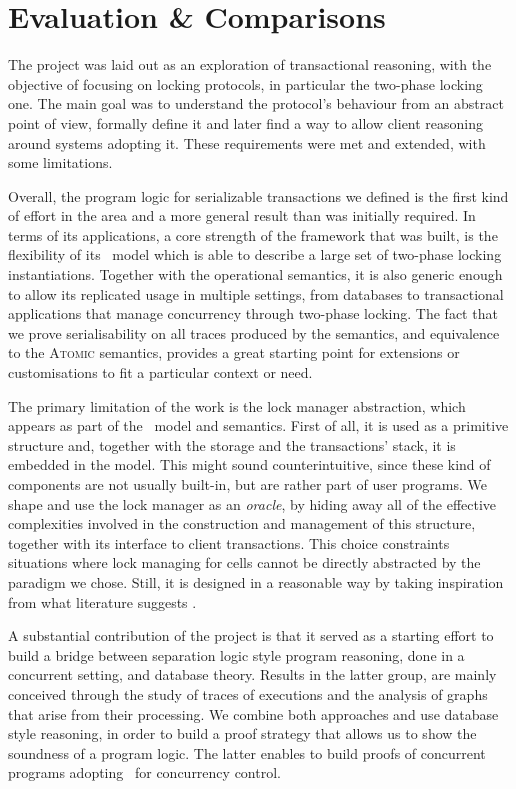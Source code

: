 \section{Evaluation \& Comparisons}

The project was laid out as an exploration of transactional reasoning, with the objective of focusing on locking protocols, in particular the two-phase locking one. The main goal was to understand the protocol's behaviour from an abstract point of view, formally define it and later find a way to allow client reasoning around systems adopting it. These requirements were met and extended, with some limitations.

Overall, the program logic for serializable transactions we defined is the first kind of effort in the area and a more general result than was initially required. In terms of its applications, a core strength of the framework that was built, is the flexibility of its \tpl\ model which is able to describe a large set of two-phase locking instantiations. Together with the operational semantics, it is also generic enough to allow its replicated usage in multiple settings, from databases to transactional applications that manage concurrency through two-phase locking. The fact that we prove serialisability on all traces produced by the semantics, and equivalence to the \textsc{Atomic} semantics, provides a great starting point for extensions or customisations to fit a particular context or need.

The primary limitation of the work is the lock manager abstraction, which appears as part of the \tpl\ model and semantics. First of all, it is used as a primitive structure and, together with the storage and the transactions' stack, it is embedded in the model. This might sound counterintuitive, since these kind of components are not usually built-in, but are rather part of user programs. We shape and use the lock manager as an \textit{oracle}, by hiding away all of the effective complexities involved in the construction and management of this structure, together with its interface to client transactions. This choice constraints situations where lock managing for cells cannot be directly abstracted by the paradigm we chose. Still, it is designed in a reasonable way by taking inspiration from what literature suggests \cite{ccontrol}.

A substantial contribution of the project is that it served as a starting effort to build a bridge between separation logic style program reasoning, done in a concurrent setting, and database theory. Results in the latter group, are mainly conceived through the study of traces of executions and the analysis of graphs that arise from their processing. We combine both approaches and use database style reasoning, in order to build a proof strategy that allows us to show the soundness of a program logic. The latter enables to build proofs of concurrent programs adopting \tpl\ for concurrency control.

